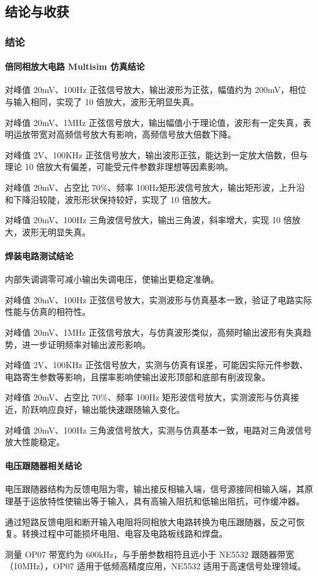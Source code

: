 \documentclass[./测控三级项目.tex]{subfiles} %
\begin{document}
	\subsection{结论与收获}
		\subsubsection{结论}
			\paragraph{ 倍同相放大电路 Multisim 仿真结论}
			对峰值 20mV、100Hz 正弦信号放大，输出波形为正弦，幅值约为 200mV，相位与输入相同，实现了 10 倍放大，波形无明显失真。\par
			对峰值 20mV、1MHz 正弦信号放大，输出幅值小于理论值，波形有一定失真，表明运放带宽对高频信号放大有影响，高频信号放大倍数下降。\par
			对峰值 2V、100KHz 正弦信号放大，输出波形正弦，能达到一定放大倍数，但与理论 10 倍放大有偏差，可能受元件参数非理想等因素影响。\par
			对峰值 20mV、占空比 70\%、频率 100Hz矩形波信号放大，输出矩形波，上升沿和下降沿较陡，波形形状保持较好，实现了 10 倍放大。\par
			对峰值 20mV、100Hz 三角波信号放大，输出三角波，斜率增大，实现 10 倍放大，波形无明显失真。
			\paragraph{\qquad 焊装电路测试结论}
			内部失调调零可减小输出失调电压，使输出更稳定准确。\par
			对峰值 20mV、100Hz 正弦信号放大，实测波形与仿真基本一致，验证了电路实际性能与仿真的相符性。\par
			对峰值 20mV、1MHz 正弦信号放大，与仿真波形类似，高频时输出波形有失真趋势，进一步证明频率对输出波形影响。\par
			对峰值 2V、100KHz 正弦信号放大，实测与仿真有误差，可能因实际元件参数、电路寄生参数等影响，且摆率影响使输出波形顶部和底部有削波现象。\par
			对峰值 20mV、占空比 70\%、频率 100Hz 矩形波信号放大，实测波形与仿真接近，阶跃响应良好，输出能快速跟随输入变化。\par
			对峰值 20mV、100Hz 三角波信号放大，实测与仿真基本一致，电路对三角波信号放大性能稳定。
			\paragraph{\qquad 电压跟随器相关结论}
			电压跟随器结构为反馈电阻为零，输出接反相输入端，信号源接同相输入端，其原理基于运放特性使输出等于输入，具有高输入阻抗和低输出阻抗，可作缓冲器。\par
			通过短路反馈电阻和断开输入电阻将同相放大电路转换为电压跟随器，反之可恢复。转换过程中可能损坏电阻、电容及电路板线路和焊盘。\par
			测量 OP07 带宽约为 600kHz，与手册参数相符且远小于 NE5532 跟随器带宽（10MHz），OP07 适用于低频高精度应用，NE5532 适用于高速信号处理领域。
\end{document}
